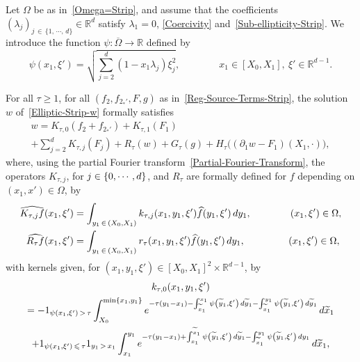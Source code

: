 \documentclass[AHL,Unicode,longabstracts]{cedram}
\newcommand*\R{\mathbb{R}}
\renewcommand{\leq}{\leqslant}
\renewcommand{\geq}{\geqslant}
\renewcommand{\tilde}{\widetilde}
\let\oldtilde\tilde
\renewcommand*{\tilde}[1]{\mathchoice{\widetilde{#1}}{\widetilde{#1}}{\oldtilde{#1}}{\oldtilde{#1}}}
\begin{document}
\break
\begin{prop}\label{Prop-parametrix-Strip-1}
Let $\Omega$ be as in~\eqref{Omega=Strip}, and assume that the coefficients $(\lambda_j)_{j \,\in\,\{1,\,\cdots,\,d\}} \in \R^d$ satisfy $\lambda_1 = 0$, \eqref{Coercivity} and~\eqref{Sub-ellipticity-Strip}. We introduce the function $\psi : \overline\Omega \to \R$ defined by
\begin{equation}\label{Def-Psi}
\psi(x_1, \xi')=\sqrt{ \sum_{j=2}^{d}\left(1-x_{1} \lambda_{j}\right) \xi_{j} ^2},
\qquad \qquad x_1 \in [X_0,X_1], \ \xi'\in \R^{d-1}.
\end{equation}

For all $\tau \geq 1$, for all $(f_2, f_{2_*'},F,g)$ as in~\eqref{Reg-Source-Terms-Strip}, the solution $w$ of~\eqref{Elliptic-Strip-w} formally satisfies
\begin{multline}\label{parametrix}
w = K_{\tau,0} \left(f_2 + f_{2_*'}\right) + K_{\tau,1}(F_1) \\
+ \sum_{j = 2}^d K_{\tau,j} (F_j) + R_\tau (w) + G_\tau(g) + H_\tau\big((\partial_1 w -F_1)(X_1, \cdot)\big),
\end{multline}
where, using the partial Fourier transform~\eqref{Partial-Fourier-Transform}, the operators $K_{\tau,j}$, for $j \in \{0,\linebreak\cdots, d\}$, and $R_\tau$ are formally defined for $f$ depending on $(x_1, x') \in \Omega$, by
\begin{align}
\widehat {K_{\tau,j} f}(x_1, \xi') & = \int_{y_1\, \in\,(X_0,X_1)} k_{\tau,j}(x_1,y_1, \xi') \widehat f(y_1, \xi') \, dy_1,
\qquad \qquad(x_1, \xi') \in \Omega,\label{Def-K-tau-j-Fourier}
\\
\widehat {R_{\tau} f}(x_1, \xi') & = \int_{y_1 \,\in\,(X_0,X_1)} r_{\tau}(x_1,y_1, \xi') \widehat f(y_1, \xi') \, dy_1,
\mkern80mu (x_1, \xi') \in \Omega,\label{Def-R-tau-Fourier}
\end{align}
with kernels given, for $(x_1,y_1, \xi') \in [X_0,X_1]^2 \times \R^{d-1}$, by
\begin{multline}\label{Def-k-tau-0-x1-y1-xi'}
k_{\tau,0}(x_1, y_1, \xi')\\
= -1_{\psi(x_1,\xi') \,>\,\tau} \int_{X_0}^{\min \{ x_1, y_1\}} e^{-\tau(y_1-x_1)-\int_{\tilde{x}_1}^{x_1} \psi\left(\tilde{y}_1,\xi'\right) \, d\tilde{y}_1 - \int_{{\tilde{x}_1}}^{y_1} \psi\left(\tilde{y}_1,\xi'\right) \,d \tilde{y}_1 } \, d \tilde{x}_1
\\
+1_{\psi(x_1,\xi')\,\leq\,\tau} 1_{y_1\,>\,x_1} \int_{x_1}^{y_1} e^{-\tau (y_1-x_1)+\int_{x_1}^{\tilde{x}_1} \psi\left(\tilde{y}_1,\xi'\right) \, d \tilde{y}_1-\int_{{\tilde{x}_1}}^{y_1} \psi\left(\tilde{y}_1,\xi'\right) \, d y_1} \, d \tilde{x}_1,

\end{multline}
\end{prop}
\end{document}

